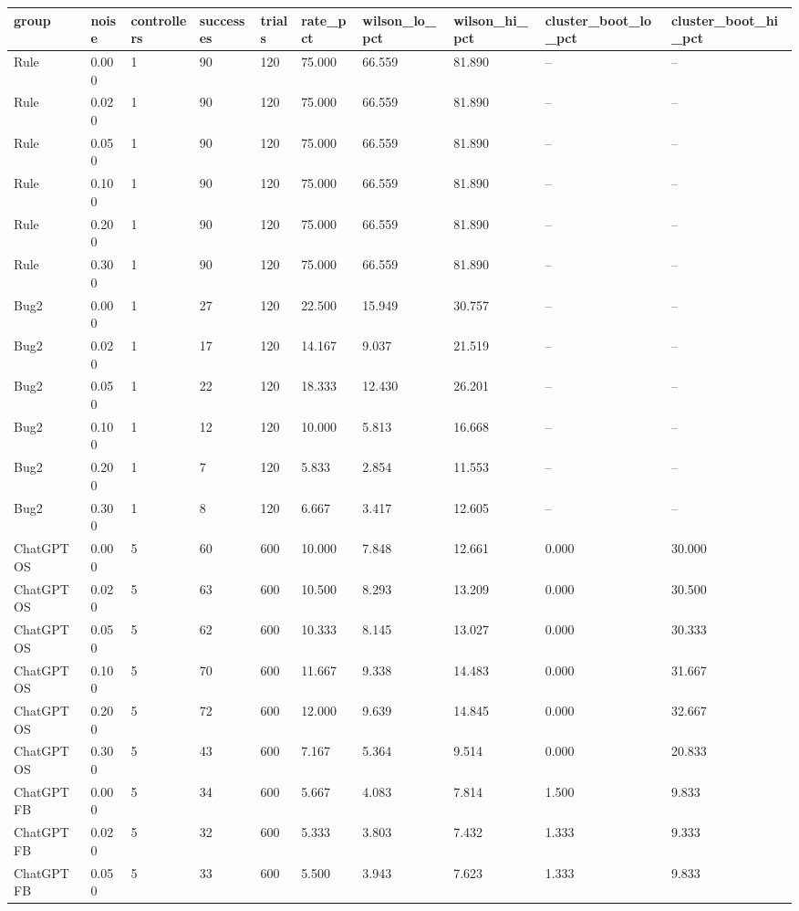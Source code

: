 \begin{tabular}{llllllllll}
\hline
group & noise & controllers & successes & trials & rate\_pct & wilson\_lo\_pct & wilson\_hi\_pct & cluster\_boot\_lo\_pct & cluster\_boot\_hi\_pct \\
\hline
Rule & 0.000 & 1 & 90 & 120 & 75.000 & 66.559 & 81.890 & -- & -- \\
Rule & 0.020 & 1 & 90 & 120 & 75.000 & 66.559 & 81.890 & -- & -- \\
Rule & 0.050 & 1 & 90 & 120 & 75.000 & 66.559 & 81.890 & -- & -- \\
Rule & 0.100 & 1 & 90 & 120 & 75.000 & 66.559 & 81.890 & -- & -- \\
Rule & 0.200 & 1 & 90 & 120 & 75.000 & 66.559 & 81.890 & -- & -- \\
Rule & 0.300 & 1 & 90 & 120 & 75.000 & 66.559 & 81.890 & -- & -- \\
Bug2 & 0.000 & 1 & 27 & 120 & 22.500 & 15.949 & 30.757 & -- & -- \\
Bug2 & 0.020 & 1 & 17 & 120 & 14.167 & 9.037 & 21.519 & -- & -- \\
Bug2 & 0.050 & 1 & 22 & 120 & 18.333 & 12.430 & 26.201 & -- & -- \\
Bug2 & 0.100 & 1 & 12 & 120 & 10.000 & 5.813 & 16.668 & -- & -- \\
Bug2 & 0.200 & 1 & 7 & 120 & 5.833 & 2.854 & 11.553 & -- & -- \\
Bug2 & 0.300 & 1 & 8 & 120 & 6.667 & 3.417 & 12.605 & -- & -- \\
ChatGPT OS & 0.000 & 5 & 60 & 600 & 10.000 & 7.848 & 12.661 & 0.000 & 30.000 \\
ChatGPT OS & 0.020 & 5 & 63 & 600 & 10.500 & 8.293 & 13.209 & 0.000 & 30.500 \\
ChatGPT OS & 0.050 & 5 & 62 & 600 & 10.333 & 8.145 & 13.027 & 0.000 & 30.333 \\
ChatGPT OS & 0.100 & 5 & 70 & 600 & 11.667 & 9.338 & 14.483 & 0.000 & 31.667 \\
ChatGPT OS & 0.200 & 5 & 72 & 600 & 12.000 & 9.639 & 14.845 & 0.000 & 32.667 \\
ChatGPT OS & 0.300 & 5 & 43 & 600 & 7.167 & 5.364 & 9.514 & 0.000 & 20.833 \\
ChatGPT FB & 0.000 & 5 & 34 & 600 & 5.667 & 4.083 & 7.814 & 1.500 & 9.833 \\
ChatGPT FB & 0.020 & 5 & 32 & 600 & 5.333 & 3.803 & 7.432 & 1.333 & 9.333 \\
ChatGPT FB & 0.050 & 5 & 33 & 600 & 5.500 & 3.943 & 7.623 & 1.333 & 9.833 \\

\end{tabular}
